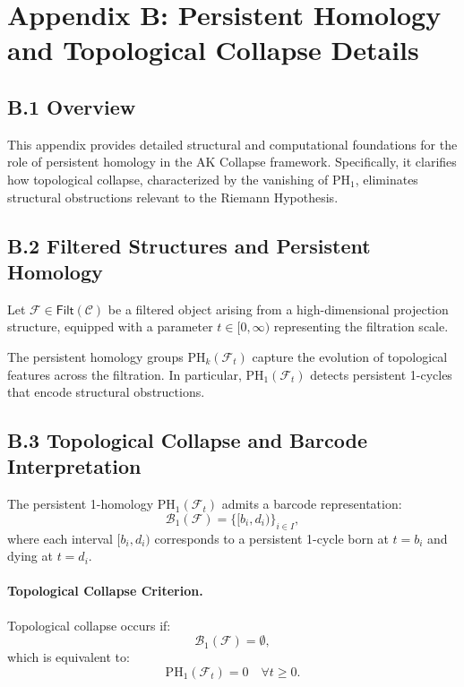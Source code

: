 \documentclass[11pt]{article}
\begin{document}
\section*{Appendix B: Persistent Homology and Topological Collapse Details}

\subsection*{B.1 Overview}

This appendix provides detailed structural and computational foundations for the role of persistent homology in the AK Collapse framework. Specifically, it clarifies how topological collapse, characterized by the vanishing of $\mathrm{PH}_1$, eliminates structural obstructions relevant to the Riemann Hypothesis.

\subsection*{B.2 Filtered Structures and Persistent Homology}

Let $\mathcal{F} \in \mathsf{Filt}(\mathcal{C})$ be a filtered object arising from a high-dimensional projection structure, equipped with a parameter $t \in [0, \infty)$ representing the filtration scale.

The persistent homology groups $\mathrm{PH}_k(\mathcal{F}_t)$ capture the evolution of topological features across the filtration. In particular, $\mathrm{PH}_1(\mathcal{F}_t)$ detects persistent 1-cycles that encode structural obstructions.

\subsection*{B.3 Topological Collapse and Barcode Interpretation}

The persistent 1-homology $\mathrm{PH}_1(\mathcal{F}_t)$ admits a barcode representation:
\[
\mathcal{B}_1(\mathcal{F}) = \{ [b_i, d_i) \}_{i \in I},
\]
where each interval $[b_i, d_i)$ corresponds to a persistent 1-cycle born at $t = b_i$ and dying at $t = d_i$.

\paragraph{Topological Collapse Criterion.}  
Topological collapse occurs if:
\[
\mathcal{B}_1(\mathcal{F}) = \emptyset,
\]
which is equivalent to:
\[
\mathrm{PH}_1(\mathcal{F}_t) = 0 \quad \forall t \geq 0.
\]
\end{document}
